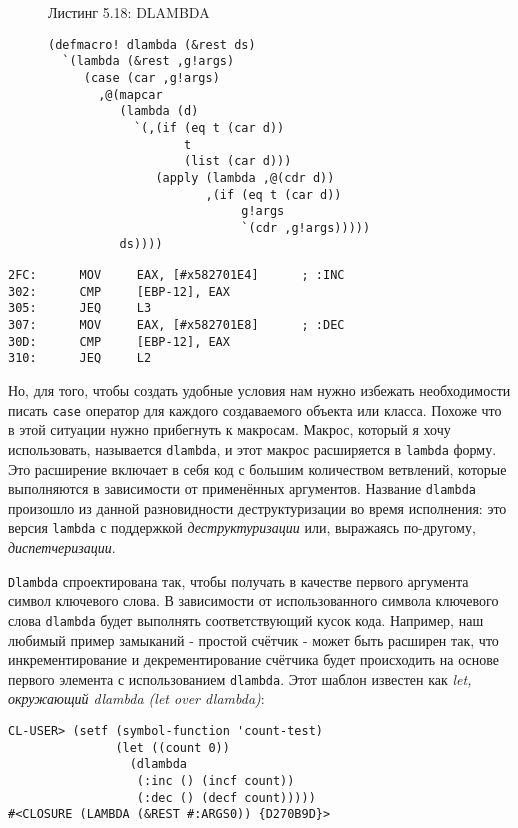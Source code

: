 \begin{figure}Листинг 5.18: DLAMBDA\label{listing_5.18}
\listbegin
\begin{verbatim}
(defmacro! dlambda (&rest ds)
  `(lambda (&rest ,g!args)
     (case (car ,g!args)
       ,@(mapcar
          (lambda (d)
            `(,(if (eq t (car d))
                   t
                   (list (car d)))
               (apply (lambda ,@(cdr d))
                      ,(if (eq t (car d))
                           g!args
                           `(cdr ,g!args)))))
          ds))))
\end{verbatim}
\listend
\end{figure}

\begin{verbatim}
2FC:      MOV     EAX, [#x582701E4]      ; :INC
302:      CMP     [EBP-12], EAX
305:      JEQ     L3
307:      MOV     EAX, [#x582701E8]      ; :DEC
30D:      CMP     [EBP-12], EAX
310:      JEQ     L2
\end{verbatim}

Но, для того, чтобы создать удобные условия нам нужно избежать необходимости писать \verb"case" оператор для каждого создаваемого объекта или класса. Похоже что в этой ситуации нужно прибегнуть к макросам. Макрос, который я хочу использовать, называется \verb"dlambda", и этот макрос расширяется в \verb"lambda" форму. Это расширение включает в себя код с большим количеством ветвлений, которые выполняются в зависимости от применённых аргументов. Название \verb"dlambda" произошло из данной разновидности деструктуризации во время исполнения: это версия \verb"lambda" с поддержкой \emph{деструктуризации} или, выражаясь по-другому, \emph{диспетчеризации}.

\verb"Dlambda" спроектирована так, чтобы получать в качестве первого аргумента символ ключевого слова. В зависимости от использованного символа ключевого слова \verb"dlambda" будет выполнять соответствующий кусок кода. Например, наш любимый пример замыканий - простой счётчик - может быть расширен так, что инкрементирование и декрементирование счётчика будет происходить на основе первого элемента с использованием \verb"dlambda". Этот шаблон известен как \emph{let, окружающий dlambda (let over dlambda)}:

\begin{verbatim}
CL-USER> (setf (symbol-function 'count-test)
               (let ((count 0))
                 (dlambda
                  (:inc () (incf count))
                  (:dec () (decf count)))))
#<CLOSURE (LAMBDA (&REST #:ARGS0)) {D270B9D}>
\end{verbatim}

